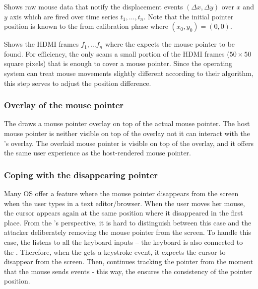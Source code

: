 \begin{mylist}
\item[]\one Shows raw mouse data that notify the displacement events $(\Delta x, \Delta y)$ over $x$ and $y$ axis which are fired over time series $t_1,\ldots, t_n$. Note that the initial pointer position is known to the \device from calibration phase where $(x_0, y_0) = (0, 0)$.  
\item[]\two Shows the HDMI frames $f_1,\ldots f_n$ where the \device expects the mouse pointer to be found. For efficiency, the \device only scans a small portion of the HDMI frames ($50 \times 50$ square pixels) that is enough to cover a mouse pointer. Since the operating system can treat mouse movements slightly different according to their algorithm, this step serves to adjust the position difference.
\end{mylist}


\subsubsection{\bfseries Overlay of the mouse pointer} The \device draws a mouse pointer overlay on top of the actual mouse pointer. The host mouse pointer is neither visible on top of the overlay not it can interact with the \device's overlay. The overlaid mouse pointer is visible on top of the overlay, and it offers the same user experience as the host-rendered mouse pointer.


\subsubsection{\bfseries Coping with the disappearing pointer} Many OS offer a feature where the mouse pointer disappears from the screen when the user types in a text editor/browser. When the user moves her mouse, the cursor appears again at the same position where it disappeared in the first place. From the \device's perspective, it is hard to distinguish between this case and the attacker deliberately removing the mouse pointer from the screen. To handle this case, the \device listens to all the keyboard inputs -- the keyboard is also connected to the \device. Therefore, when the \device gets a keystroke event, it expects the cursor to disappear from the screen. Then, \device continues tracking the pointer from the moment that the mouse sends events  - this way, the \device ensures the consistency of the pointer position.  


